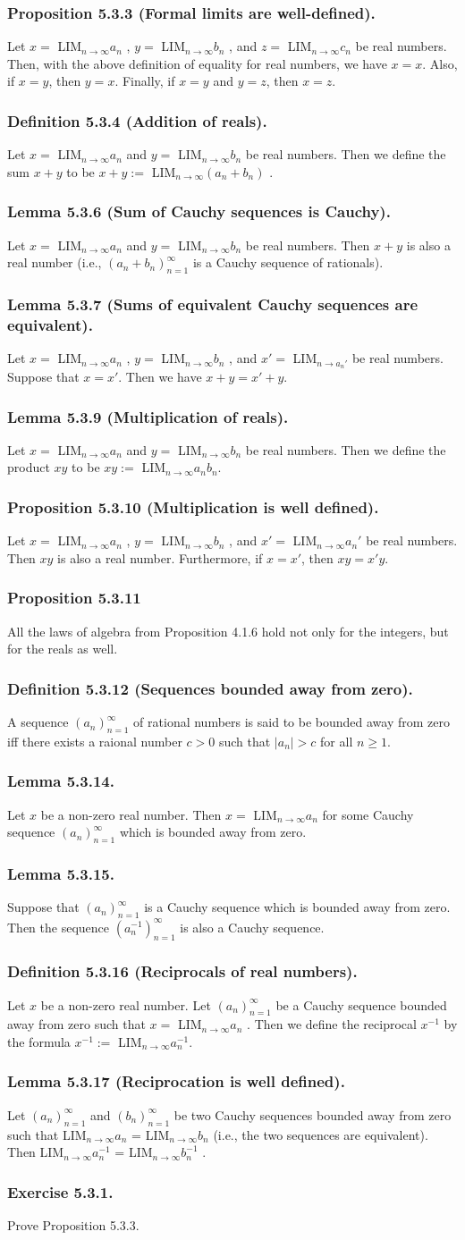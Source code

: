 \documentclass[12pt, letter]{article}
\newcommand{\ssc}{\subsubsection* }
\newcommand{\an}{$(a_n)_{n=1}^\infty$ }
\newcommand{\bn}{$(b_n)_{n=1}^\infty$ }
\newcommand{\la}{LIM$_{n\to\infty}a_n$ }
\newcommand{\lb}{LIM$_{n\to\infty}b_n$ }
\newcommand{\lc}{LIM$_{n\to\infty}c_n$ }
\newcommand{\lao}{LIM$_{n\to\infty}a_n^{-1}$ }
\newcommand{\lbo}{LIM$_{n\to\infty}b_n^{-1}$ }
\newcommand{\lab}{LIM$_{n\to\infty}(a_n+b_n)$ }
\newcommand{\E}{Exercise }
\begin{document}
\subsubsection*{Proposition 5.3.3 (Formal limits are well-defined).}
Let $x=$ \la, $y=$ \lb, and $z=$ \lc be real numbers. Then, with the above definition of equality for real numbers, we have $x=x$. Also, if $x=y$, then $y=x$.
Finally, if $x=y$ and $y=z$, then $x=z$.
\subsubsection*{Definition 5.3.4 (Addition of reals).}
Let $x=$ \la and $y=$ \lb be real numbers. Then we define the sum $x+y$ to be $x+y:=$ \lab.
\ssc{Lemma 5.3.6 (Sum of Cauchy sequences is Cauchy).}
Let $x=$ \la and $y=$ \lb be real numbers. Then $x+y$ is also a real number (i.e., $(a_n+b_n)_{n=1}^\infty$ is a Cauchy sequence of rationals).
\ssc{Lemma 5.3.7 (Sums of equivalent Cauchy sequences are equivalent).}
Let $x=$ \la, $y=$ \lb, and $x'=$ LIM$_{n\to a_n'}$ be real numbers. Suppose that $x=x'$. Then we have $x+y=x'+y$.
\ssc{Lemma 5.3.9 (Multiplication of reals).}
Let $x=$ \la and $y=$ \lb be real numbers. Then we define the product $xy$ to be $xy:=$ LIM$_{n\to\infty}a_n b_n$.
\ssc{Proposition 5.3.10 (Multiplication is well defined).}
Let $x=$ \la, $y=$ \lb, and $x'=$ LIM$_{n\to\infty}a_n'$ be real numbers. Then $xy$ is also a real number. Furthermore, if $x=x'$, then $xy=x'y$.
\ssc{Proposition 5.3.11}
All the laws of algebra from Proposition 4.1.6 hold not only for the integers, but for the reals as well.
\ssc{Definition 5.3.12 (Sequences bounded away from zero).}
A sequence \an of rational numbers is said to be bounded away from zero iff there exists a raional number $c>0$ such that $|a_n|>c$ for all $n\geq 1$.
\ssc{Lemma 5.3.14.}
Let $x$ be a non-zero real number. Then $x=$ \la for some Cauchy sequence \an which is bounded away from zero.
\ssc{Lemma 5.3.15.}
Suppose that \an is a Cauchy sequence which is bounded away from zero. Then the sequence $(a_n^{-1})_{n=1}^\infty$ is also a Cauchy sequence.
\ssc{Definition 5.3.16 (Reciprocals of real numbers).}
Let $x$ be a non-zero real number. Let \an be a Cauchy sequence bounded away from zero such that $x=$ \la. Then we define the reciprocal $x^{-1}$ by the formula
$x^{-1}:=$ LIM$_{n\to\infty}a_n^{-1}$. 
\ssc{Lemma 5.3.17 (Reciprocation is well defined).}
Let \an and \bn be two Cauchy sequences bounded away from zero such that \la = \lb (i.e., the two sequences are equivalent). Then \lao = \lbo.
\ssc{\E 5.3.1.}
Prove Proposition 5.3.3.
\end{document}
